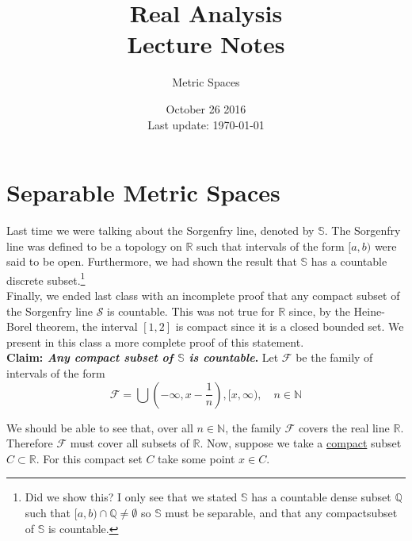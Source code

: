 \documentclass[12pt]{article}
\newlength\tindent
\renewcommand{\indent}{\hspace*{\tindent}}
\newcommand{\R}{\mathbb R}
\newcommand{\N}{\mathbb N}
\newcommand{\Q}{\mathbb Q}
\begin{document}
 
 
\title{Real Analysis\\Lecture Notes}
\author{Metric Spaces}
\date{October 26 2016 \\ Last update: \today{}}
\maketitle

\section{Separable Metric Spaces}

\indent Last time we were talking about the Sorgenfry line, denoted by $\mathbb S$. The Sorgenfry line was defined to be a topology on $\R$ such that intervals of the form $[a,b)$ were said to be open. Furthermore, we had shown the result that $\mathbb S$ has a countable discrete subset.\footnote{Did we show this? I only see that we stated $\mathbb S$ has a countable dense subset $\Q$ such that $[a,b) \cap \Q \neq \emptyset$ so $\mathbb S$ must be separable, and that any compact\footnotemark subset of $\mathbb S$ is countable.}
 \\

\indent Finally, we ended last class with an incomplete proof that any compact subset of the Sorgenfry line $\mathcal S$ is countable. This was not true for $\R$ since, by the Heine-Borel theorem, the interval $[1,2]$ is compact since it is a closed bounded set. We present in this class a more complete proof of this statement. \\

%
%
{\bf Claim: {\em Any compact subset of $\bm{\mathbb S}$ is countable}.} Let $\mathcal F$ be the family of intervals of the form
\begin{equation*}
	\mathcal F = \bigcup \left(-\infty, x - \frac{1}{n} \right), [x, \infty), \quad n \in \N
\end{equation*}

\indent We should be able to see that, over all $n \in \N$, the family $\mathcal F$ covers the real line $\R$. Therefore $\mathcal F$ must cover all subsets of $\R$. Now, suppose we take a \underline{compact} subset $C \subset \R$. For this compact set $C$ take some point $x \in C$. \\
\end{document}
